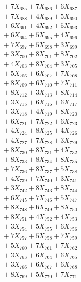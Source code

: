 \documentclass[a4paper,10pt]{article}
\begin{document}
{\begin{align}
&\;  + 7 X_{685} + 7 X_{686} + 6 X_{687} \\[0.3ex]
&\;  + 7 X_{688} + 4 X_{689} + 5 X_{690} \\[0.3ex]
&\;  + 6 X_{691} + 4 X_{692} + 5 X_{693} \\[0.3ex]
&\;  + 6 X_{694} + 5 X_{695} + 4 X_{696} \\[0.3ex]
&\;  + 7 X_{697} + 5 X_{698} + 3 X_{699} \\[0.5ex]\allowbreak
&\;  + 3 X_{700} + 8 X_{701} + 8 X_{702} \\[0.3ex]
&\;  + 4 X_{703} + 8 X_{704} + 3 X_{705} \\[0.3ex]
&\;  + 5 X_{706} + 6 X_{707} + 7 X_{708} \\[0.3ex]
&\;  + 8 X_{709} + 6 X_{710} + 7 X_{711} \\[0.3ex]
&\;  + 8 X_{712} + 3 X_{713} + 8 X_{714} \\[0.3ex]
&\;  + 3 X_{715} + 6 X_{716} + 6 X_{717} \\[0.3ex]
&\;  + 3 X_{718} + 4 X_{719} + 8 X_{720} \\[0.3ex]
&\;  + 6 X_{721} + 7 X_{722} + 6 X_{723} \\[0.3ex]
&\;  + 4 X_{724} + 8 X_{725} + 4 X_{726} \\[0.3ex]
&\;  + 4 X_{727} + 7 X_{728} + 3 X_{729} \\[0.5ex]\allowbreak
&\;  + 8 X_{730} + 8 X_{731} + 4 X_{732} \\[0.3ex]
&\;  + 8 X_{733} + 8 X_{734} + 8 X_{735} \\[0.3ex]
&\;  + 7 X_{736} + 8 X_{737} + 5 X_{738} \\[0.3ex]
&\;  + 4 X_{739} + 7 X_{740} + 3 X_{741} \\[0.3ex]
&\;  + 3 X_{742} + 8 X_{743} + 8 X_{744} \\[0.3ex]
&\;  + 6 X_{745} + 7 X_{746} + 5 X_{747} \\[0.3ex]
&\;  + 8 X_{748} + 6 X_{749} + 8 X_{750} \\[0.3ex]
&\;  + 8 X_{751} + 4 X_{752} + 4 X_{753} \\[0.3ex]
&\;  + 3 X_{754} + 5 X_{755} + 6 X_{756} \\[0.3ex]
&\;  + 7 X_{757} + 5 X_{758} + 7 X_{759} \\[0.5ex]\allowbreak
&\;  + 5 X_{760} + 7 X_{761} + 7 X_{762} \\[0.3ex]
&\;  + 3 X_{763} + 6 X_{764} + 6 X_{765} \\[0.3ex]
&\;  + 3 X_{766} + 6 X_{767} + 6 X_{768} \\[0.3ex]
&\;  + 8 X_{769} + 5 X_{770} + 7 X_{771} \\[0.3ex]

\end{align}}
\end{document}
